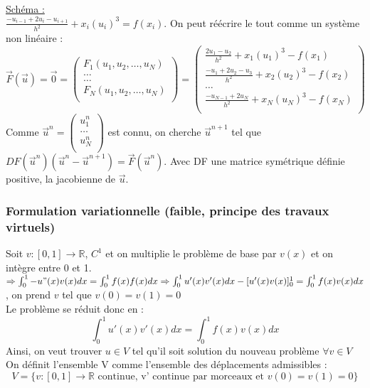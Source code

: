 \documentclass[../main.tex]{subfiles}
\begin{document}
\quad \underline{Schéma :}\\
$\frac{-u_{i-1}+2u_i - u_{i+1}}{h^2} + x_i(u_i)^3 = f(x_i)$. On peut réécrire le tout comme un système non linéaire : \\
\begin{equation}
    \Vec{F}(\Vec{u}) = \Vec{0} = \begin{pmatrix}
        F_1 (u_1, u_2, \dots, u_N)\\
        \dots\\
        \dots \\
        F_N(u_1, u_2, \dots, u_N)\\
    \end{pmatrix} = \begin{pmatrix}
        \frac{2u_1-u_2}{h^2} + x_1 (u_1)^3 - f(x_1)\\
        \frac{-u_1+2u_2-u_3}{h^2} + x_2 (u_2)^3 - f(x_2)\\
        \dots\\
        \frac{-u_{N-1}+2u_N}{h^2} + x_N (u_N)^3 - f(x_N)\\
    \end{pmatrix}
\end{equation}
Comme $\Vec{u}^n = \begin{pmatrix}
    u_1^n\\
    \dots\\
    u_N^n\\
\end{pmatrix}$ est connu, on cherche $\Vec{u}^{n+1}$ tel que $DF(\Vec{u}^n)(\Vec{u}^n-\Vec{u}^{n+1}) = \Vec{F}(\Vec{u}^n)$. Avec DF une matrice symétrique définie positive, la jacobienne de $\Vec{u}$.\\

\subsubsection{Formulation variationnelle (faible, principe des travaux virtuels)}
Soit $v:[0,1] \rightarrow \mathbb{R}$, $C^1$ et on multiplie le problème de base par $v(x)$ et on intègre entre 0 et 1.\\
$\Rightarrow \int_0^1 -u"(x)v(x)dx = \int_0^1f(x)f(x)dx \Rightarrow \int_0^1 u'(x)v'(x)dx - [u'(x)v(x)]_0^1 = \int_0^1 f(x)v(x)dx$, on prend $v$ tel que $v(0)=v(1)=0$\\
Le problème se réduit donc en :\\
\begin{equation}
    \int_0^1 u'(x)v'(x)dx = \int_0^1 f(x)v(x)dx
\end{equation}
Ainsi, on veut trouver $u\in V$ tel qu'il soit solution du nouveau problème $\forall v \in V$\\
On définit l'ensemble V comme l'ensemble des déplacements admissibles :\\
\begin{equation}
    V = \{v:[0,1] \rightarrow \mathbb{R} \text{ continue, v' continue par morceaux et } v(0)=v(1)=0\}
\end{equation}
\end{document}
